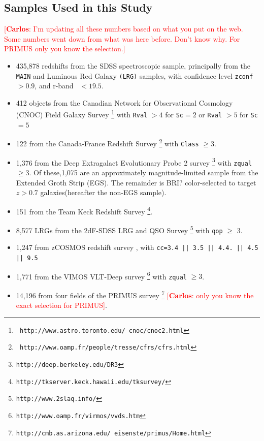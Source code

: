 \documentclass[preprint]{aastex}
\newcommand{\cc}[1]{\textcolor{red}{[{\bf Carlos}: #1]}}
\begin{document}
\subsection{Samples Used in this Study} \label{sec:train:def}

\cc{I'm updating all these numbers based on what you put on the web. Some numbers went down from what was here before. Don't know why. For PRIMUS only you know the selection.}
\begin{itemize} 

    \item 435,878 redshifts from the SDSS spectroscopic sample,
principally from the \texttt{MAIN} and Luminous Red Galaxy \texttt{(LRG)}
samples, with confidence level \texttt{zconf}$ > 0.9$, and r-band
\cmodelmag\ $ <19.5$.


    \item 412 objects from the Canadian Network for Observational
Cosmology (CNOC) Field Galaxy Survey \cite[CNOC2;][]{yee00}\footnote{\tt
http://www.astro.toronto.edu/~cnoc/cnoc2.html} with \texttt{Rval} $>4$
for \texttt{Sc}$=2$ or \texttt{Rval} $> 5$ for \texttt{Sc}$=5$

    \item 122 from the Canada-France Redshift
Survey \cite[CFRS;][]{lilly95}\footnote{\tt
http://www.oamp.fr/people/tresse/cfrs/cfrs.html} with \texttt{Class} $\geq 3$.

    \item 1,376 from the Deep Extragalact Evolutionary Probe 2 survey
\citep[DEEP2;][]{weiner05}\footnote{\tt http://deep.berkeley.edu/DR3}
with \texttt{zqual} $\geq 3$. 
Of these,1,075 are an approximately magnitude-limited sample from the Extended Groth Strip (EGS).
The remainder is BRI? color-selected to target $z>0.7$ galaxies(hereafter the non-EGS sample). 

    \item 151 from the Team Keck Redshift Survey \cite[TKRS;][]{wirth04}\footnote{\tt http://tkserver.keck.hawaii.edu/tksurvey/}.

    \item 8,577 LRGs from the 2dF-SDSS LRG and QSO Survey \cite[2SLAQ;][]{cannon06}\footnote{\tt http://www.2slaq.info/} with \texttt{qop} $\geq$ 3.

    \item  1,247 from zCOSMOS redshift survey \cite{lilly07}, with  \texttt{cc=3.4 || 3.5 || 4.4.  || 4.5 || 9.5}
    
    \item 1,771 from the VIMOS VLT-Deep survey \cite[VVDS;][]{garilli08}\footnote{\tt http://www.oamp.fr/virmos/vvds.htm} with \texttt{zqual} $\geq 3$.

    \item 14,196 from four fields of the PRIMUS survey \cite[PRIMUS;][]{coil10}\footnote{\tt http://cmb.as.arizona.edu/~eisenste/primus/Home.html} \cc{only you know the exact selection for PRIMUS}.
      
\end{itemize}
\end{document}
